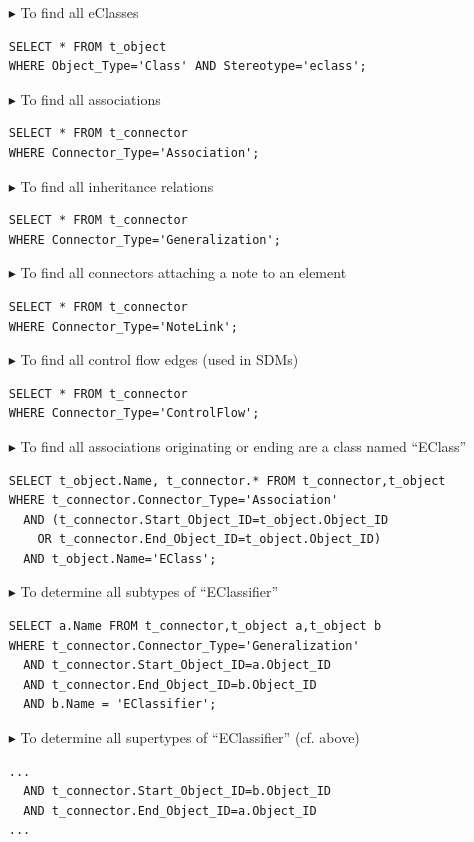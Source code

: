 \begin{enumerate}
\item[$\blacktriangleright$]
To find all eClasses
\begin{lstlisting}[frame=single,framerule=0pt]
SELECT * FROM t_object
WHERE Object_Type='Class' AND Stereotype='eclass';
\end{lstlisting}

\item[$\blacktriangleright$]
To find all associations
\begin{lstlisting}[frame=single,framerule=0pt]
SELECT * FROM t_connector
WHERE Connector_Type='Association';
\end{lstlisting}

\item[$\blacktriangleright$]
To find all inheritance relations
\begin{lstlisting}[frame=single,framerule=0pt]
SELECT * FROM t_connector
WHERE Connector_Type='Generalization';
\end{lstlisting}

\item[$\blacktriangleright$]
To find all connectors attaching a note to an element 
\begin{lstlisting}[frame=single,framerule=0pt]
SELECT * FROM t_connector
WHERE Connector_Type='NoteLink';
\end{lstlisting}

\item[$\blacktriangleright$]
To find all control flow edges (used in SDMs)
\begin{lstlisting}[frame=single,framerule=0pt]
SELECT * FROM t_connector
WHERE Connector_Type='ControlFlow';
\end{lstlisting}

\item[$\blacktriangleright$]
To find all associations originating or ending are a class named ``EClass''
\begin{lstlisting}[frame=single,framerule=0pt]
SELECT t_object.Name, t_connector.* FROM t_connector,t_object
WHERE t_connector.Connector_Type='Association'
  AND (t_connector.Start_Object_ID=t_object.Object_ID
    OR t_connector.End_Object_ID=t_object.Object_ID)
  AND t_object.Name='EClass';
\end{lstlisting}

\item[$\blacktriangleright$]
To determine all subtypes of ``EClassifier''
\begin{lstlisting}[frame=single,framerule=0pt]
SELECT a.Name FROM t_connector,t_object a,t_object b
WHERE t_connector.Connector_Type='Generalization'
  AND t_connector.Start_Object_ID=a.Object_ID
  AND t_connector.End_Object_ID=b.Object_ID
  AND b.Name = 'EClassifier';
\end{lstlisting}

\item[$\blacktriangleright$]
To determine all supertypes of ``EClassifier'' (cf. above)
\begin{lstlisting}[frame=single,framerule=0pt]
...
  AND t_connector.Start_Object_ID=b.Object_ID
  AND t_connector.End_Object_ID=a.Object_ID
...
\end{lstlisting}
\end{enumerate}

